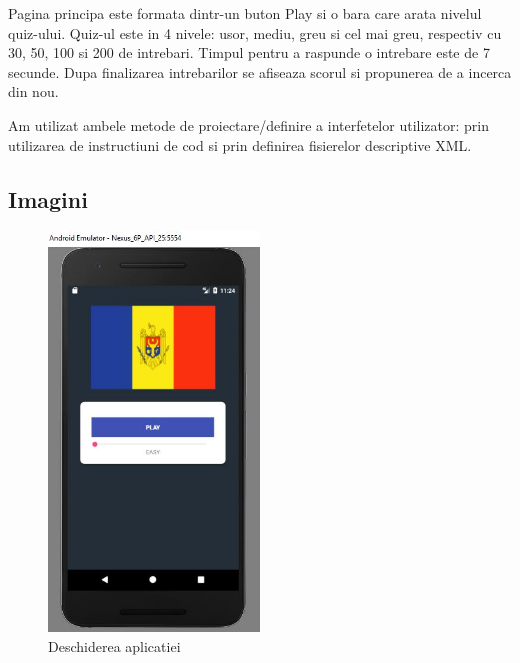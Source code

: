 Pagina principa este formata dintr-un buton Play si o bara care arata nivelul quiz-ului. Quiz-ul este in 4 nivele: usor, mediu, greu si cel mai greu, respectiv cu 30, 50, 100 si 200 de intrebari. Timpul pentru a raspunde o intrebare este de 7 secunde. Dupa finalizarea intrebarilor se afiseaza scorul si propunerea de a incerca din nou. 

Am utilizat ambele metode de proiectare/definire a interfetelor utilizator: prin utilizarea de instructiuni de cod si prin definirea fisierelor descriptive XML.


  

\subsection{Imagini}




\begin{figure}[!ht]
	
	\centering
	
	\includegraphics[width=0.5\textwidth]{Cattura.JPG}
	
	\caption{Deschiderea aplicatiei}
	
	\label{Im_label}
	
\end{figure}

